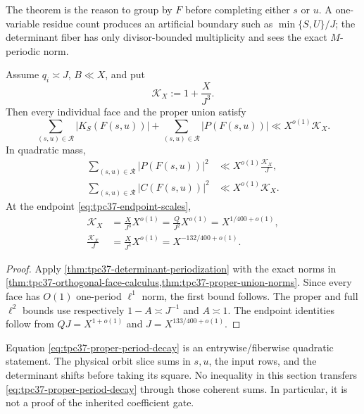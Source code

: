 The theorem is the reason to group by \(F\) before completing either
\(s\) or \(u\).  A one-variable residue count produces an artificial
boundary such as \(\min\{S,U\}/J\); the determinant fiber has only
divisor-bounded multiplicity and sees the exact \(M\)-periodic norm.

\begin{corollary}
\label{cor:tpc37-periodization-ledger}
Assume \(q_i\asymp J\), \(B\ll X\), and put
\begin{equation}
 \mathcal K_X:=1+\frac X{J^3}.
 \label{eq:tpc37-critical-period-count}
\end{equation}
Then every individual face and the proper union satisfy
\begin{equation}
 \sum_{(s,u)\in\mathcal R}|K_S(F(s,u))|
 +\sum_{(s,u)\in\mathcal R}|P(F(s,u))|
 \ll X^{o(1)}\mathcal K_X.
 \label{eq:tpc37-all-face-l1-periodization}
\end{equation}
In quadratic mass,
\begin{align}
 \sum_{(s,u)\in\mathcal R}|P(F(s,u))|^2
 &\ll X^{o(1)}\frac{\mathcal K_X}{J},
 \label{eq:tpc37-proper-l2-periodization}\\
 \sum_{(s,u)\in\mathcal R}|C(F(s,u))|^2
 &\ll X^{o(1)}\mathcal K_X.
 \label{eq:tpc37-full-l2-periodization}
\end{align}
At the endpoint \eqref{eq:tpc37-endpoint-scales},
\begin{align}
 \mathcal K_X
 &=\frac X{J^3}X^{o(1)}
 =\frac Q{J^2}X^{o(1)}
 =X^{1/400+o(1)},
 \label{eq:tpc37-critical-period-endpoint}\\
 \frac{\mathcal K_X}{J}
 &=\frac X{J^4}X^{o(1)}
 =X^{-132/400+o(1)}.
 \label{eq:tpc37-proper-period-decay}
\end{align}
\end{corollary}

\begin{proof}
Apply \cref{thm:tpc37-determinant-periodization} with the exact norms in
\cref{thm:tpc37-orthogonal-face-calculus,thm:tpc37-proper-union-norms}.
Since every face has \(O(1)\) one-period \(\ell^1\) norm, the first bound
follows.  The proper and full \(\ell^2\) bounds use respectively
\(1-A\asymp J^{-1}\) and \(A\asymp1\).  The endpoint identities follow
from \(QJ=X^{1+o(1)}\) and \(J=X^{133/400+o(1)}\).
\end{proof}

\begin{remark}
\label{rem:tpc37-quadratic-not-physical}
Equation \eqref{eq:tpc37-proper-period-decay} is an entrywise/fiberwise
quadratic statement.  The physical orbit slice sums in \(s,u\), the input
rows, and the determinant shifts before taking its square.  No inequality
in this section transfers \eqref{eq:tpc37-proper-period-decay} through
those coherent sums.  In particular, it is not a proof of the inherited
coefficient gate.
\end{remark}

